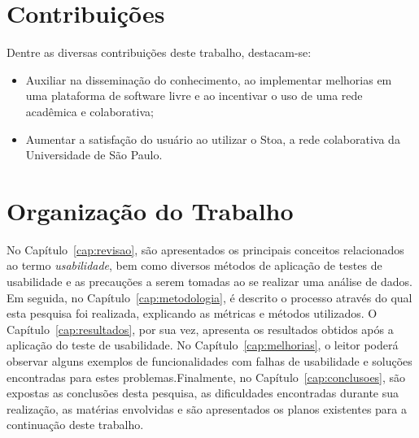 \section{Contribuições}
\label{sec:contribucoes}

    Dentre as diversas contribuições deste trabalho, destacam-se:

\begin{itemize}
  \item {
    Auxiliar na disseminação do conhecimento, ao implementar melhorias em uma plataforma de software livre e ao incentivar o uso de uma rede acadêmica e colaborativa;
  }
  \item {
    Aumentar a satisfação do usuário ao utilizar o Stoa, a rede colaborativa da Universidade de São Paulo.
  }
\end{itemize}

\section{Organização do Trabalho}
\label{sec:organizacao_trabalho}

No Capítulo~\ref{cap:revisao}, são apresentados os principais conceitos relacionados ao termo \emph{usabilidade}, bem como diversos métodos de aplicação de testes de usabilidade e as precauções a serem tomadas ao se realizar uma análise de dados. 
Em seguida, no Capítulo~\ref{cap:metodologia}, é descrito o processo através do qual esta pesquisa foi realizada, explicando as métricas e métodos utilizados. O Capítulo~\ref{cap:resultados}, por sua vez, apresenta os resultados obtidos após a aplicação do teste de usabilidade. No Capítulo~\ref{cap:melhorias}, o leitor poderá observar alguns exemplos de funcionalidades com falhas de usabilidade e soluções encontradas para estes problemas.Finalmente, no
Capítulo~\ref{cap:conclusoes}, são expostas as conclusões desta pesquisa, as dificuldades encontradas durante sua realização, as matérias envolvidas e são apresentados os planos existentes para a continuação deste trabalho.


